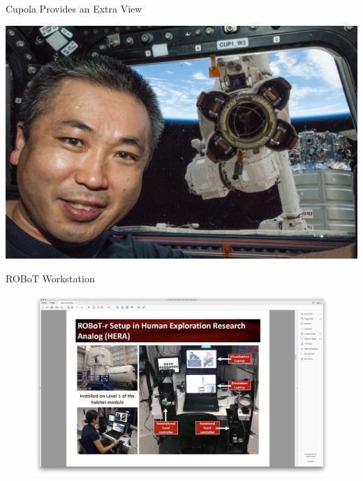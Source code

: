 \documentclass[10pt]{beamer}
\begin{document}
\begin{frame}[fragile]{Cupola Provides an Extra View}
  \begin{center}
    \includegraphics[width=\textwidth]{../img/12085915275_c7f77c537e_k.jpg}
  \end{center}
\end{frame}

\begin{frame}[fragile]{ROBoT Workstation}
\begin{figure}
  \begin{center}
    \includegraphics[trim={13cm 5cm 22cm 15.5cm},clip,width=\linewidth]{../img/Screen_Shot_2018-07-26_at_1.43.16_PM.png}
  \end{center}
\end{figure}
\end{frame}
\end{document}
